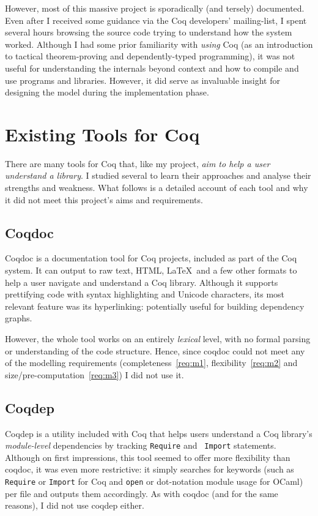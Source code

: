 However, most of this massive project is sporadically (and tersely) documented.
Even after I received some guidance via the Coq developers' mailing-list, I
spent several hours browsing the source code trying to understand how the system
worked. Although I had some prior familiarity with \emph{using} Coq (as an
introduction to tactical theorem-proving and dependently-typed programming), it
was not useful for understanding the internals beyond context and how to compile
and use programs and libraries. However, it did serve as invaluable insight for
designing the model during the implementation phase.

\section{Existing Tools for Coq}\label{prep:coqtools}

There are many tools for Coq that, like my project, \emph{aim to help a user
understand a library}. I studied several to learn their approaches and analyse
their strengths and weakness. What follows is a detailed account of each tool
and why it did not meet this project's aims and requirements.

\subsection{Coqdoc}

Coqdoc is a documentation tool for Coq projects, included as part of the Coq
system. It can output to raw text, HTML, \LaTeX~and a few other formats to help
a user navigate and understand a Coq library.  Although it supports prettifying
code with syntax highlighting and Unicode characters, its most relevant feature
was its hyperlinking: potentially useful for building dependency graphs.

However, the whole tool works on an entirely \emph{lexical} level, with no
formal parsing or understanding of the code structure. Hence, since coqdoc could
not meet any of the modelling requirements (completeness~\ref{req:m1},
flexibility~\ref{req:m2} and size/pre-computation~\ref{req:m3}) I did not use
it.

\subsection{Coqdep}

Coqdep is a utility included with Coq that helps users understand a Coq
library's \emph{module-level} dependencies by tracking {\tt Require} and {\tt
Import} statements.  Although on first impressions, this tool seemed to offer
more flexibility than coqdoc, it was even more restrictive: it simply searches
for keywords (such as \texttt{Require} or \texttt{Import} for Coq  and
\texttt{open} or dot-notation module usage for OCaml) per file and outputs them
accordingly. As with coqdoc (and for the same reasons), I did not use coqdep
either.

